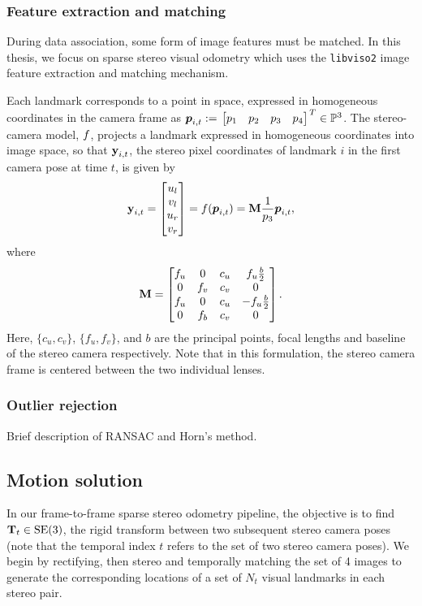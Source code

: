 \subsubsection{Feature extraction and matching}

During data association, some form of image features must be matched. In this thesis, we focus on sparse stereo visual odometry which uses the \texttt{libviso2} image feature extraction and matching mechanism.  

Each landmark corresponds to a
point in space, expressed in homogeneous coordinates in the camera frame as
$\HomogeneousPoint{i}{t} := \Transpose{\bbm p_1 & p_2 & p_3 & p_4 \ebm} \in
\HomogeneousNumbers[3]$.  The stereo-camera model, $f$,
projects a landmark expressed in homogeneous coordinates into image space, so
that $\boldsymbol{\mathbf{y}}_{i,t}$, the stereo pixel coordinates of landmark $i$ in the first camera pose at time $t$, is given
by 
\begin{equation}
	\boldsymbol{\mathbf{y}}_{i,t} = \begin{bmatrix} u_l \\ v_l \\ u_r \\ v_r \end{bmatrix} 
  = f(\boldsymbol{p}_{i,t}) 
  = \boldsymbol{\mathbf{M}} \frac{1}{p_3}\boldsymbol{p}_{i,t},
\end{equation}
where
\begin{equation}
 \boldsymbol{\mathbf{M}} = \begin{bmatrix} f_u & 0 & c_u & f_u \frac{b}{2} \\ 0 & f_v & c_v & 0 \\ f_u 
                        & 0 & c_u & -f_u\frac{b}{2} \\ 0 & f_b & c_v & 0 \end{bmatrix}.
\end{equation}
Here, $\{c_u, c_v\}$, $\{f_u, f_v\}$, and $b$ are the principal points, focal
lengths and baseline of the stereo camera respectively. Note that in this
formulation, the stereo camera frame is centered between the two individual
lenses.  


\subsubsection{Outlier rejection}

Brief description of RANSAC and Horn's method.

\subsection{Motion solution}

In our frame-to-frame sparse stereo odometry pipeline,  the objective is to find
$\boldsymbol{\mathbf{T}}_t\in\text{SE}(3)$, the rigid transform between two subsequent stereo camera poses (note that the temporal index $t$ refers to the set of two stereo camera poses). We begin by rectifying, then stereo and temporally
matching the set of 4 images to generate the corresponding locations of a set
of $N_t$ visual landmarks in each stereo pair.  

